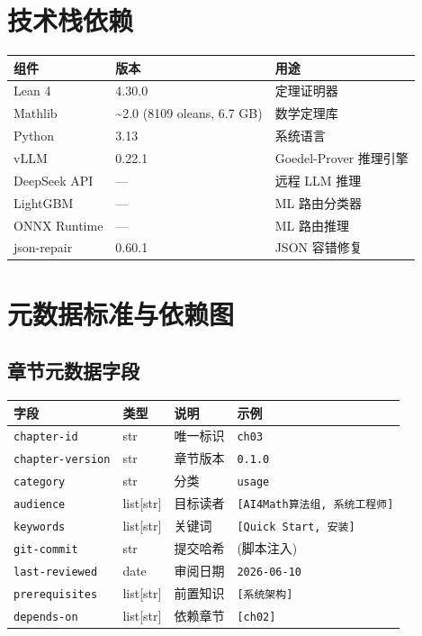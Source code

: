 \documentclass[
  11pt,
  a4paper,
]{ctexrep}
\newcounter{none} %
\begin{document}
\chapter{技术栈依赖}\label{ux6280ux672fux6808ux4f9dux8d56}

{\def\LTcaptype{none} %
\begin{longtable}[]{@{}lll@{}}
\toprule\noalign{}
组件 & 版本 & 用途 \\
\midrule\noalign{}
\endhead
\bottomrule\noalign{}
\endlastfoot
Lean 4 & 4.30.0 & 定理证明器 \\
Mathlib & \textasciitilde2.0 (8109 oleans, 6.7 GB) & 数学定理库 \\
Python & 3.13 & 系统语言 \\
vLLM & 0.22.1 & Goedel-Prover 推理引擎 \\
DeepSeek API & --- & 远程 LLM 推理 \\
LightGBM & --- & ML 路由分类器 \\
ONNX Runtime & --- & ML 路由推理 \\
json-repair & 0.60.1 & JSON 容错修复 \\
\end{longtable}
}

\newpage

\chapter{元数据标准与依赖图}\label{ux5143ux6570ux636eux6807ux51c6ux4e0eux4f9dux8d56ux56fe}

\section{章节元数据字段}\label{ux7ae0ux8282ux5143ux6570ux636eux5b57ux6bb5}

{\def\LTcaptype{none} %
\begin{longtable}[]{@{}llll@{}}
\toprule\noalign{}
字段 & 类型 & 说明 & 示例 \\
\midrule\noalign{}
\endhead
\bottomrule\noalign{}
\endlastfoot
\texttt{chapter-id} & str & 唯一标识 & \texttt{ch03} \\
\texttt{chapter-version} & str & 章节版本 & \texttt{0.1.0} \\
\texttt{category} & str & 分类 & \texttt{usage} \\
\texttt{audience} & list{[}str{]} & 目标读者 &
\texttt{{[}AI4Math算法组,\ 系统工程师{]}} \\
\texttt{keywords} & list{[}str{]} & 关键词 &
\texttt{{[}Quick\ Start,\ 安装{]}} \\
\texttt{git-commit} & str & 提交哈希 & (脚本注入) \\
\texttt{last-reviewed} & date & 审阅日期 & \texttt{2026-06-10} \\
\texttt{prerequisites} & list{[}str{]} & 前置知识 &
\texttt{{[}系统架构{]}} \\
\texttt{depends-on} & list{[}str{]} & 依赖章节 & \texttt{{[}ch02{]}} \\
\end{longtable}
}
\end{document}
